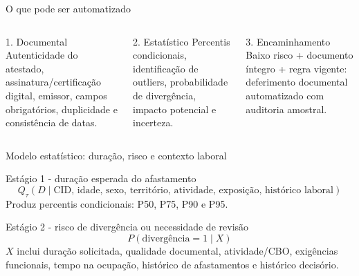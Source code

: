 \documentclass[presentation,aspectratio=169]{beamer}
\begin{document}
\begin{frame}[t]{O que pode ser automatizado}
\begin{columns}[T,onlytextwidth]
\begin{block}{1. Documental}\small
Autenticidade do atestado, assinatura/certificação digital, emissor, campos obrigatórios, duplicidade e consistência de datas.
\end{block}
\begin{block}{2. Estatístico}\small
Percentis condicionais, identificação de outliers, probabilidade de divergência, impacto potencial e incerteza.
\end{block}
\begin{block}{3. Encaminhamento}\small
Baixo risco + documento íntegro + regra vigente: deferimento documental automatizado com auditoria amostral.
\end{block}
\end{columns}
\vfill
{}
\end{frame}

\begin{frame}[t]{Modelo estatístico: duração, risco e contexto laboral}
\begin{block}{Estágio 1 - duração esperada do afastamento}
\[
Q_{\tau}(D \mid \text{CID, idade, sexo, território, atividade, exposição, histórico laboral})
\]
\small Produz percentis condicionais: P50, P75, P90 e P95.
\end{block}
\vspace{0.10cm}
\begin{block}{Estágio 2 - risco de divergência ou necessidade de revisão}
\[
P(\text{divergência}=1 \mid X)
\]
\small $X$ inclui duração solicitada, qualidade documental, atividade/CBO, exigências funcionais, tempo na ocupação, histórico de afastamentos e histórico decisório.
\end{block}
\vfill
{}
\end{frame}
\end{document}
